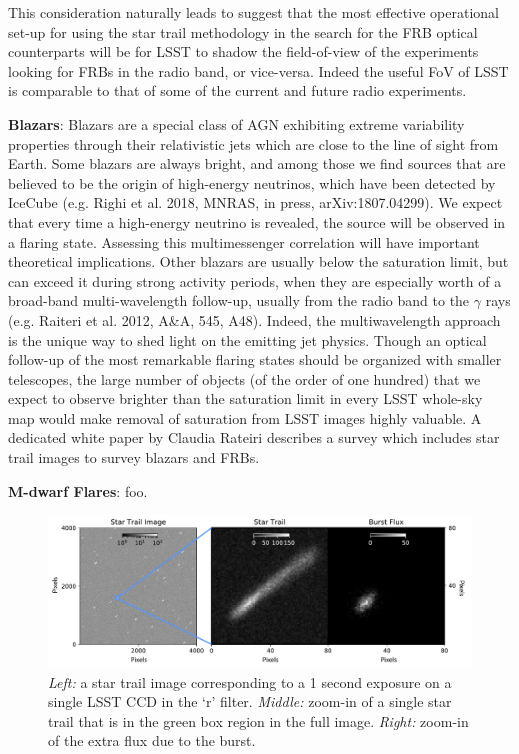 \documentclass[12pt, letterpaper]{article}
\begin{document}
This consideration naturally leads to suggest that the most effective operational set-up for using the star trail methodology in the search for the FRB optical counterparts will be for LSST to shadow the field-of-view of the experiments looking for FRBs in the radio band, or vice-versa. Indeed the useful FoV of LSST is comparable to that of some of the current and future radio experiments.

{\bf Blazars}: Blazars are a special class of AGN exhibiting extreme variability properties through their relativistic jets which are close to the line of sight from Earth. Some blazars are always bright, and among those we find sources that are believed to be the origin of high-energy neutrinos, which have been detected by IceCube (e.g. Righi et al. 2018, MNRAS, in press, arXiv:1807.04299). We expect that every time a high-energy neutrino is revealed, the source will be observed in a flaring state. Assessing this multimessenger correlation will have important theoretical implications. Other blazars are usually below the saturation limit, but can exceed it during strong activity periods, when they are especially worth of a broad-band multi-wavelength follow-up, usually from the radio band to the $\gamma$ rays (e.g. Raiteri et al. 2012, A\&A, 545, A48). Indeed, the multiwavelength approach is the unique way to shed light on the emitting jet physics. Though an optical follow-up of the most remarkable flaring states should be organized with smaller telescopes, the large number of objects (of the order of one hundred) that we expect to observe brighter than the saturation limit in every LSST whole-sky map would make removal of saturation from LSST images highly valuable. A dedicated white paper by Claudia Rateiri describes a survey which includes star trail images to survey blazars and FRBs.

{\bf M-dwarf Flares}: foo.

\begin{figure}[htb]
\center
\includegraphics[width=1.00\columnwidth]{star_trail.pdf}
\caption{\textit{Left:} a star trail image corresponding to a 1 second exposure on a single LSST CCD in the `r' filter. \textit{Middle:} zoom-in of a single star trail that is in the green box region in the full image. \textit{Right:} zoom-in of the extra flux due to the burst.}
\label{fig:trail}
\end{figure}
\end{document}
